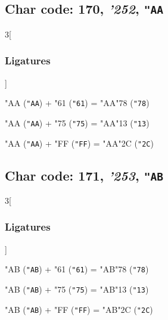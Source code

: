 \documentclass{article}
\newlength{\maxcharwidth}
\begin{document}
\subsection{Char code: 170, {\it'252}, {\tt"AA}}
\label{char_170}


\begin{multicols}{3}[\subsubsection{Ligatures}]

{\testfont\char"AA\noboundary} ({\tt"AA}) + {\testfont\char"61\noboundary} ({\tt"61}) = {\testfont\char"AA\noboundary}{\testfont\char"78\noboundary} ({\tt"78}) 

{\testfont\char"AA\noboundary} ({\tt"AA}) + {\testfont\char"75\noboundary} ({\tt"75}) = {\testfont\char"AA\noboundary}{\testfont\char"13\noboundary} ({\tt"13}) 

{\testfont\char"AA\noboundary} ({\tt"AA}) + {\testfont\char"FF\noboundary} ({\tt"FF}) = {\testfont\char"AA\noboundary}{\testfont\char"2C\noboundary} ({\tt"2C}) 

\end{multicols}

\subsection{Char code: 171, {\it'253}, {\tt"AB}}
\label{char_171}


\begin{multicols}{3}[\subsubsection{Ligatures}]

{\testfont\char"AB\noboundary} ({\tt"AB}) + {\testfont\char"61\noboundary} ({\tt"61}) = {\testfont\char"AB\noboundary}{\testfont\char"78\noboundary} ({\tt"78}) 

{\testfont\char"AB\noboundary} ({\tt"AB}) + {\testfont\char"75\noboundary} ({\tt"75}) = {\testfont\char"AB\noboundary}{\testfont\char"13\noboundary} ({\tt"13}) 

{\testfont\char"AB\noboundary} ({\tt"AB}) + {\testfont\char"FF\noboundary} ({\tt"FF}) = {\testfont\char"AB\noboundary}{\testfont\char"2C\noboundary} ({\tt"2C}) 

\end{multicols}
\end{document}
